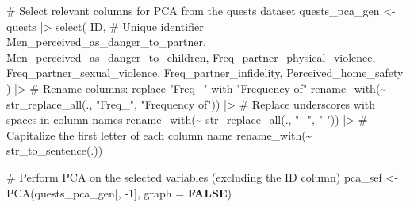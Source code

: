 \documentclass[
  bookmarksnumbered]{article}
\newenvironment{Shaded}{\begin{snugshade}}{\end{snugshade}}
\newcommand{\AttributeTok}[1]{\textcolor[rgb]{0.80,0.80,0.80}{#1}}
\newcommand{\CommentTok}[1]{\textcolor[rgb]{0.50,0.62,0.50}{#1}}
\newcommand{\ConstantTok}[1]{\textcolor[rgb]{0.86,0.64,0.64}{\textbf{#1}}}
\newcommand{\DecValTok}[1]{\textcolor[rgb]{0.86,0.86,0.80}{#1}}
\newcommand{\FunctionTok}[1]{\textcolor[rgb]{0.94,0.94,0.56}{#1}}
\newcommand{\NormalTok}[1]{\textcolor[rgb]{0.80,0.80,0.80}{#1}}
\newcommand{\OtherTok}[1]{\textcolor[rgb]{0.94,0.94,0.56}{#1}}
\newcommand{\SpecialCharTok}[1]{\textcolor[rgb]{0.86,0.64,0.64}{#1}}
\newcommand{\StringTok}[1]{\textcolor[rgb]{0.80,0.58,0.58}{#1}}
\begin{document}
\begin{Shaded}
\begin{Highlighting}[]
\CommentTok{\# Select relevant columns for PCA from the \textquotesingle{}quests\textquotesingle{} dataset}
\NormalTok{quests\_pca\_gen }\OtherTok{\textless{}{-}}\NormalTok{ quests }\SpecialCharTok{|\textgreater{}}
  \FunctionTok{select}\NormalTok{(}
\NormalTok{    ID,  }\CommentTok{\# Unique identifier}
\NormalTok{    Men\_perceived\_as\_danger\_to\_partner,}
\NormalTok{    Men\_perceived\_as\_danger\_to\_children,}
\NormalTok{    Freq\_partner\_physical\_violence,}
\NormalTok{    Freq\_partner\_sexual\_violence,}
\NormalTok{    Freq\_partner\_infidelity,}
\NormalTok{    Perceived\_home\_safety}
\NormalTok{  ) }\SpecialCharTok{|\textgreater{}}
  \CommentTok{\# Rename columns: replace "Freq\_" with "Frequency of"}
  \FunctionTok{rename\_with}\NormalTok{(}\SpecialCharTok{\textasciitilde{}} \FunctionTok{str\_replace\_all}\NormalTok{(., }\StringTok{"Freq\_"}\NormalTok{, }\StringTok{"Frequency of"}\NormalTok{)) }\SpecialCharTok{|\textgreater{}}
  \CommentTok{\# Replace underscores with spaces in column names}
  \FunctionTok{rename\_with}\NormalTok{(}\SpecialCharTok{\textasciitilde{}} \FunctionTok{str\_replace\_all}\NormalTok{(., }\StringTok{"\_"}\NormalTok{, }\StringTok{" "}\NormalTok{)) }\SpecialCharTok{|\textgreater{}}
  \CommentTok{\# Capitalize the first letter of each column name}
  \FunctionTok{rename\_with}\NormalTok{(}\SpecialCharTok{\textasciitilde{}} \FunctionTok{str\_to\_sentence}\NormalTok{(.))}

\CommentTok{\# Perform PCA on the selected variables (excluding the ID column)}
\NormalTok{pca\_sef }\OtherTok{\textless{}{-}} \FunctionTok{PCA}\NormalTok{(quests\_pca\_gen[, }\SpecialCharTok{{-}}\DecValTok{1}\NormalTok{], }\AttributeTok{graph =} \ConstantTok{FALSE}\NormalTok{)}


\end{Highlighting}
\end{Shaded}
\end{document}
